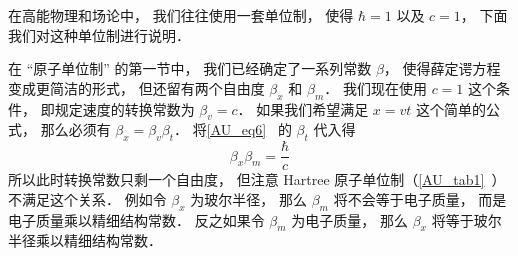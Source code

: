 
\begin{issues}
\issueDraft
\end{issues}


在高能物理和场论中， 我们往往使用一套单位制， 使得 $\hbar = 1$ 以及 $c = 1$， 下面我们对这种单位制进行说明．

在 “原子单位制” 的第一节中， 我们已经确定了一系列常数 $\beta$， 使得薛定谔方程变成更简洁的形式， 但还留有两个自由度 $\beta_x$ 和 $\beta_m$． 我们现在使用 $c = 1$ 这个条件， 即规定速度的转换常数为 $\beta_v = c$． 如果我们希望满足 $x = vt$ 这个简单的公式， 那么必须有 $\beta_x = \beta_v \beta _t$． 将\autoref{AU_eq6}~ 的 $\beta_t$ 代入得
\begin{equation}
\beta_x \beta_m = \frac{\hbar}{c}
\end{equation}
所以此时转换常数只剩一个自由度， 但注意 Hartree 原子单位制（\autoref{AU_tab1}~）不满足这个关系． 例如令 $\beta_x$ 为玻尔半径， 那么 $\beta_m$ 将不会等于电子质量， 而是电子质量乘以精细结构常数． 反之如果令 $\beta_m$ 为电子质量， 那么 $\beta_x$ 将等于玻尔半径乘以精细结构常数．
